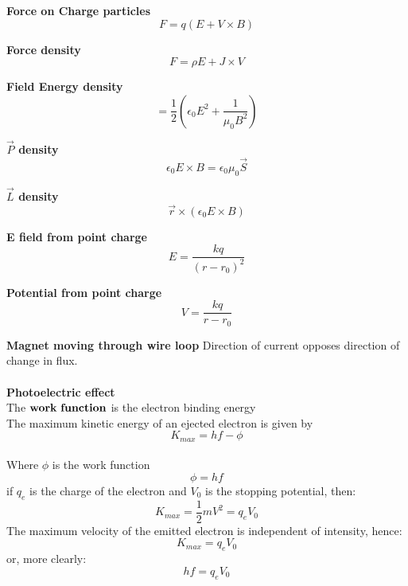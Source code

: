 \documentclass{article}
\begin{document}
{\bf{Force on Charge particles}}\begin{equation}F=q(E+V\times B)\end{equation}

{\bf{Force density}}\begin{equation}F=\rho E + J\times V\end{equation}

{\bf{Field Energy density}}\begin{equation}=\frac{1}{2} (\epsilon_0 E^2 + \frac{1}{\mu_0 B^2})\end{equation}

{\bf{$\vec{P}$ density}} \begin{equation}\epsilon_0 E \times B = \epsilon_0 \mu_0 \vec{S}\end{equation}

{\bf{$\vec{L}$ density}}\begin{equation}\vec{r}\times (\epsilon_0 E \times B)\end{equation}

{\bf{E field from point charge}}\begin{equation}E=\frac{kq}{(r-r_0)^2}\end{equation}

{\bf{Potential from point charge}}\begin{equation}V=\frac{kq}{r-r_0}\end{equation}

{\bf{Magnet moving through wire loop}} Direction of current opposes direction of change in flux.
\\
\\
{\bf{Photoelectric effect}} \\
The ${\bf{work\ function}}$ is the electron binding energy\\
The maximum kinetic energy of an ejected electron is given by \begin{equation}K_{max} = hf-\phi \end{equation}\\
Where $\phi$ is the work function\\
\begin{equation}\phi = hf\end{equation}
if $q_e$ is the charge of the electron and $V_0$ is the stopping potential, then:
\begin{equation}K_{max} = \frac{1}{2}mV^2 = q_e V_0\end{equation} 
The maximum velocity of the emitted electron is independent of intensity, hence:
\begin{equation}K_{max} = q_e V_0\end{equation}
or, more clearly:\begin{equation}hf = q_e V_0\end{equation}
\end{document}
